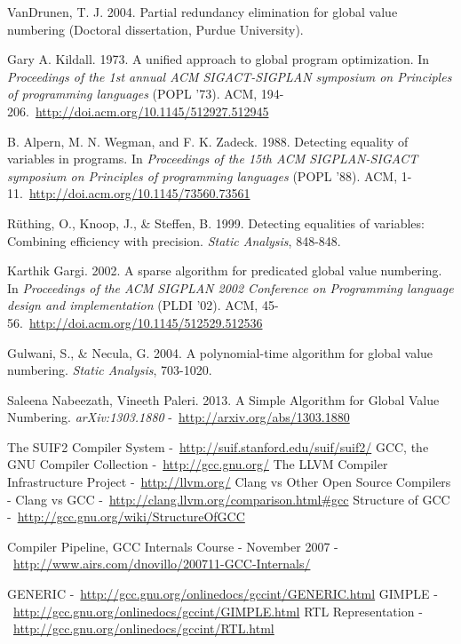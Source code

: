 \cleardoublepage
{}
{}
\begin{thebibliography}{99}

VanDrunen, T. J. 2004. Partial redundancy elimination for global value numbering (Doctoral dissertation, Purdue University).

Gary A. Kildall. 1973. A unified approach to global program optimization. In \emph{Proceedings of the 1st annual ACM SIGACT-SIGPLAN symposium on Principles of programming languages} (POPL '73). ACM, 194-206.\ \url{http://doi.acm.org/10.1145/512927.512945}

B. Alpern, M. N. Wegman, and F. K. Zadeck. 1988. Detecting equality of variables in programs. In \emph{Proceedings of the 15th ACM SIGPLAN-SIGACT symposium on Principles of programming languages} (POPL '88). ACM, 1-11.\ \url{http://doi.acm.org/10.1145/73560.73561}

R\"uthing, O., Knoop, J., \& Steffen, B. 1999. Detecting equalities of variables: Combining efficiency with precision. \emph{Static Analysis}, 848-848.

Karthik Gargi. 2002. A sparse algorithm for predicated global value numbering. In \emph{Proceedings of the ACM SIGPLAN 2002 Conference on Programming language design and implementation} (PLDI '02). ACM, 45-56.\ \url{http://doi.acm.org/10.1145/512529.512536}

Gulwani, S., \& Necula, G. 2004. A polynomial-time algorithm for global value numbering. \emph{Static Analysis}, 703-1020.

Saleena Nabeezath, Vineeth Paleri. 2013. A Simple Algorithm for Global Value Numbering. \emph{arXiv:1303.1880} -\ \url{http://arxiv.org/abs/1303.1880}

The SUIF2 Compiler System -\ \url{http://suif.stanford.edu/suif/suif2/}
GCC, the GNU Compiler Collection -\ \url{http://gcc.gnu.org/}
The LLVM Compiler Infrastructure Project -\ \url{http://llvm.org/}
Clang vs Other Open Source Compilers - Clang vs GCC -\ \url{http://clang.llvm.org/comparison.html#gcc}
Structure of GCC -\ \url{http://gcc.gnu.org/wiki/StructureOfGCC}

Compiler Pipeline, GCC Internals Course - November 2007 -\ \url{http://www.airs.com/dnovillo/200711-GCC-Internals/}

GENERIC -\ \url{http://gcc.gnu.org/onlinedocs/gccint/GENERIC.html}
GIMPLE -\ \url{http://gcc.gnu.org/onlinedocs/gccint/GIMPLE.html}
RTL Representation -\ \url{http://gcc.gnu.org/onlinedocs/gccint/RTL.html}


\end{thebibliography}
